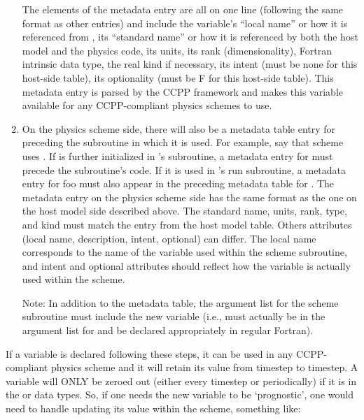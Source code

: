 \begin{enumerate}
The elements of the metadata entry are all on one line (following the same format as other entries) and include the variable's ``local name'' or how it is referenced from , its ``standard name'' or how it is referenced by both the host model and the physics code, its units, its rank (dimensionality), Fortran intrinsic data type, the real kind if necessary, its intent (must be none for this host-side table), its optionality (must be F for this host-side table). This metadata entry is parsed by the CCPP framework and makes this variable available for any CCPP-compliant physics schemes to use.

\item On the physics scheme side, there will also be a metadata table entry for  preceding the subroutine in which it is used. For example, say that scheme  uses . If  is further initialized in 's  subroutine, a metadata entry for  must precede the  subroutine's code. If it is used in 's run subroutine, a metadata entry for foo must also appear in the preceding metadata table for . The metadata entry on the physics scheme side has the same format as the one on the host model side described above. The standard name, units, rank, type, and kind must match the entry from the host model table. Others attributes (local name, description, intent, optional) can differ. The local name corresponds to the name of the variable used within the scheme subroutine, and intent and optional attributes should reflect how the variable is actually used within the scheme.
	
Note: In addition to the metadata table, the argument list for the scheme subroutine must include the new variable (i.e.,  must actually be in the argument list for  and be declared appropriately in regular Fortran).

\end{enumerate}

If a variable is declared following these steps, it can be used in any CCPP-compliant physics scheme and it will retain its value from timestep to timestep. A variable will ONLY be zeroed out (either every timestep or periodically) if it is in the  or  data types. So, if one needs the new variable to be `prognostic', one would need to handle updating its value within the scheme, something like:


